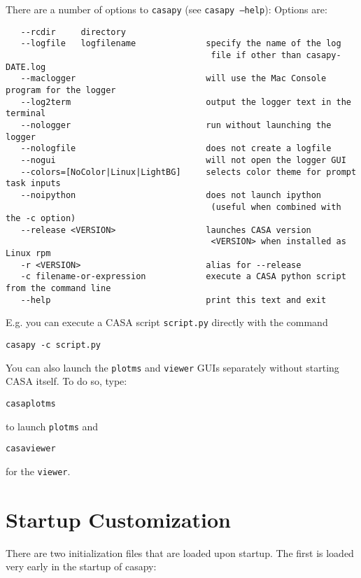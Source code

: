 There are a number of options to {\tt casapy} (see {\tt casapy --help}):
Options are: 
\small
\begin{verbatim}
   --rcdir     directory
   --logfile   logfilename              specify the name of the log
                                         file if other than casapy-DATE.log
   --maclogger                          will use the Mac Console program for the logger
   --log2term                           output the logger text in the terminal
   --nologger                           run without launching the logger
   --nologfile                          does not create a logfile 
   --nogui                              will not open the logger GUI 
   --colors=[NoColor|Linux|LightBG]     selects color theme for prompt task inputs
   --noipython                          does not launch ipython
                                         (useful when combined with the -c option)
   --release <VERSION>                  launches CASA version
                                         <VERSION> when installed as Linux rpm
   -r <VERSION>                         alias for --release
   -c filename-or-expression            execute a CASA python script from the command line 
   --help                               print this text and exit
\end{verbatim}
\normalsize

E.g. you can execute a CASA script {\tt script.py} directly with the command
\small
\begin{verbatim}
casapy -c script.py
\end{verbatim}
\normalsize


You can also launch the {\tt plotms} and {\tt viewer} GUIs separately
without starting CASA itself. To do so, type:

\small
\begin{verbatim}
casaplotms
\end{verbatim}
\normalsize
to launch {\tt plotms} and 
\small
\begin{verbatim}
casaviewer
\end{verbatim}
\normalsize
for the {\tt viewer}.




\section{Startup Customization}
\label{section:install.customization}

There are two initialization files that are loaded upon startup. The
first is loaded very early in the startup of casapy:

